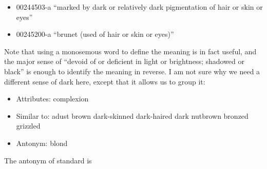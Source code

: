 \documentclass[headrule,footrule]{foils}
\begin{document}
\maketitle


\begin{itemize}
\item 00244503-a  ``marked by dark or relatively
  dark pigmentation of hair or skin or eyes''
\item 00245200-a 	``brunet (used of hair or skin or eyes)''	
\end{itemize}

Note that using a monosemous word to define the meaning is in fact
useful, and the major sense of  ``devoid of or deficient in
light or brightness; shadowed or black'' is enough to identify the
meaning in reverse.
\newpage
I am not sure why we need a different sense of dark here, except that
it allows us to group it:
\begin{itemize}
\item Attributes:	complexion
\item Similar to:	adust brown dark-skinned dark-haired dark
  nutbrown bronzed grizzled
\item Antonym:	blond
\end{itemize}

The antonym of standard  is 

 
 
\end{document}

